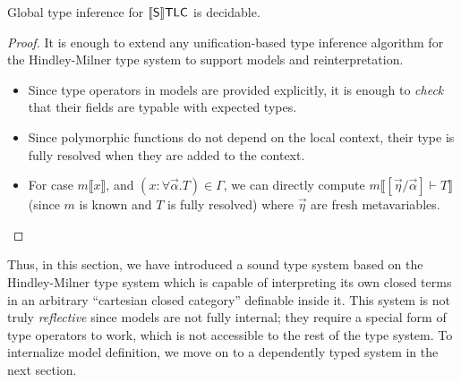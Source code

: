 \newpage
\begin{theorem}
    Global type inference for $\llbracket\mathsf{S}\rrbracket\mathsf{TLC}$ is decidable.
\end{theorem}
\begin{proof}
    It is enough to extend any unification-based type
    inference algorithm for the Hindley-Milner type
    system to support models and reinterpretation.
    \begin{itemize}
        \item Since type operators in models are
            provided explicitly, it is enough to
            \textit{check} that their fields are typable
            with expected types.
        \item Since polymorphic functions do not depend
            on the local context, their type is fully
            resolved when they are added to the context.
        \item For case $m\llbracket x\rrbracket$, and
            $(x:\forall\vec{\alpha}.T)\in\Gamma$, we can
            directly compute $m\llbracket[\vec{\eta}/
            \vec{\alpha}]\vdash T\rrbracket$ (since
            $m$ is known and $T$ is fully resolved)
            where $\vec{\eta}$ are fresh metavariables.
    \end{itemize}
\end{proof}

Thus, in this section, we have introduced a sound type
system based on the Hindley-Milner type system which is
capable of interpreting its own closed terms in an
arbitrary ``cartesian closed category'' definable inside
it. This system is not truly \textit{reflective} since
models are not fully internal; they require a special
form of type operators to work, which is not accessible
to the rest of the type system. To internalize model
definition, we move on to a dependently typed system in
the next section.

